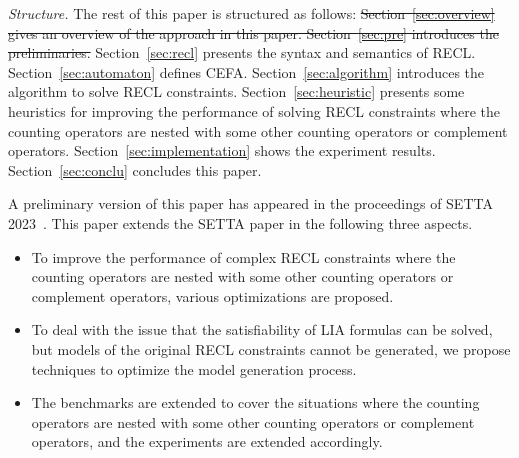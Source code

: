 
\smallskip
\noindent
\emph{Structure.} 
The rest of this paper is structured as follows: \sout{Section~\ref{sec:overview} gives an overview of the approach in this paper. Section~\ref{sec:pre} introduces the preliminaries.} 
Section~\ref{sec:recl} presents the syntax and semantics of RECL. 
Section~\ref{sec:automaton} defines CEFA. Section~\ref{sec:algorithm} introduces the algorithm to solve RECL constraints. 
Section~\ref{sec:heuristic} presents some heuristics for improving the performance of solving RECL constraints where the counting operators are nested with some other counting operators or complement operators. Section~\ref{sec:implementation} shows the experiment results. Section~\ref{sec:conclu} concludes this paper.

\smallskip

A preliminary version of this paper has appeared in the proceedings of SETTA 2023~\cite{Denghang2023}. This paper extends the SETTA paper in the following three aspects.
\begin{itemize}
\item To improve the performance of complex RECL constraints where the counting operators are nested with some other counting operators or complement operators, various optimizations are proposed. 
\item To deal with the issue that the satisfiability of LIA formulas can be solved, but models of the original RECL constraints cannot be generated, we propose techniques to optimize the model generation process.  
\item The benchmarks are extended to cover the situations where the counting operators are nested with some other counting operators or complement operators, and the experiments are extended accordingly.  
\end{itemize}